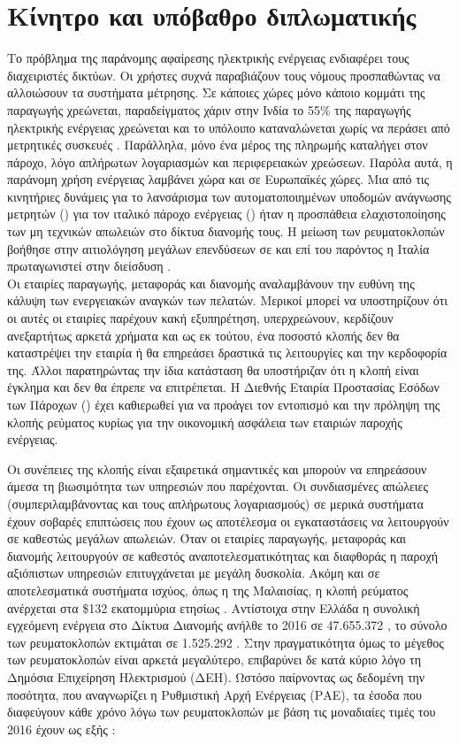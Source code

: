 \section{Κίνητρο και υπόβαθρο διπλωματικής}
Το πρόβλημα της παράνομης αφαίρεσης ηλεκτρικής ενέργειας ενδιαφέρει τους διαχειριστές δικτύων. Οι χρήστες συχνά παραβιάζουν τους νόμους προσπαθώντας να αλλοιώσουν τα συστήματα μέτρησης. Σε κάποιες χώρες μόνο κάποιο κομμάτι της παραγωγής χρεώνεται, παραδείγματος χάριν στην Ινδία το 55\% της παραγωγής ηλεκτρικής ενέργειας χρεώνεται και το υπόλοιπο καταναλώνεται χωρίς να περάσει από μετρητικές συσκευές \cite{india}. Παράλληλα, μόνο ένα μέρος της πληρωμής καταλήγει στον πάροχο, λόγο απλήρωτων λογαριασμών και περιφερειακών χρεώσεων. Παρόλα αυτά, η παράνομη χρήση ενέργειας λαμβάνει χώρα και σε Ευρωπαϊκές χώρες. Μια από τις κινητήριες δυνάμεις για το λανσάρισμα των αυτοματοποιημένων υποδομών ανάγνωσης μετρητών () για τον ιταλικό πάροχο ενέργειας () ήταν η προσπάθεια ελαχιστοποίησης των μη τεχνικών απωλειών στο δίκτυα διανομής τους. Η μείωση των ρευματοκλοπών βοήθησε στην αιτιολόγηση μεγάλων επενδύσεων σε  και επί του παρόντος η Ιταλία πρωταγωνιστεί στην διείσδυση  \cite{regulation}.\\ 
Οι εταιρίες παραγωγής, μεταφοράς και διανομής αναλαμβάνουν την ευθύνη της κάλυψη των ενεργειακών αναγκών των πελατών. Μερικοί μπορεί να υποστηρίζουν ότι οι αυτές οι εταιρίες παρέχουν κακή εξυπηρέτηση, υπερχρεώνουν, κερδίζουν ανεξαρτήτως αρκετά χρήματα και ως εκ τούτου, ένα ποσοστό κλοπής δεν θα καταστρέψει την εταιρία ή θα επηρεάσει δραστικά τις λειτουργίες και την κερδοφορία της. Άλλοι παρατηρώντας την ίδια κατάσταση θα υποστήριζαν ότι η κλοπή είναι έγκλημα και δεν θα έπρεπε να επιτρέπεται. Η Διεθνής Εταιρία Προστασίας Εσόδων των Πάροχων () έχει καθιερωθεί για να προάγει τον εντοπισμό και την πρόληψη της κλοπής ρεύματος κυρίως για την οικονομική ασφάλεια των εταιριών παροχής ενέργειας.\par
Οι συνέπειες της κλοπής είναι εξαιρετικά σημαντικές και μπορούν να επηρεάσουν άμεσα τη βιωσιμότητα των υπηρεσιών που παρέχονται. Οι συνδιασμένες απώλειες (συμπεριλαμβάνοντας και τους απλήρωτους λογαριασμούς) σε μερικά συστήματα έχουν σοβαρές επιπτώσεις που έχουν ως αποτέλεσμα οι εγκαταστάσεις να λειτουργούν σε καθεστώς μεγάλων απωλειών. Όταν οι εταιρίες παραγωγής, μεταφοράς και διανομής λειτουργούν σε καθεστός αναποτελεσματικότητας και διαφθοράς η παροχή αξιόπιστων υπηρεσιών επιτυγχάνεται με μεγάλη δυσκολία. Ακόμη και σε αποτελεσματικά συστήματα ισχύος, όπως η  της Μαλαισίας, η κλοπή ρεύματος ανέρχεται στα \$132 εκατομμύρια ετησίως \cite{malaysia}. Αντίστοιχα στην Ελλάδα η συνολική εγχεόμενη ενέργεια στο Δίκτυα Διανομής ανήλθε το 2016 σε 47.655.372 , το σύνολο των ρευματοκλοπών εκτιμάται σε 1.525.292 . Στην πραγματικότητα όμως το μέγεθος των ρευματοκλοπών είναι αρκετά μεγαλύτερο, επιβαρύνει δε κατά κύριο λόγο τη Δημόσια Επιχείρηση Ηλεκτρισμού (ΔΕΗ). Ωστόσο παίρνοντας ως δεδομένη την ποσότητα, που αναγνωρίζει η Ρυθμιστική Αρχή Ενέργειας (ΡΑΕ), τα έσοδα που διαφεύγουν κάθε χρόνο λόγω των ρευματοκλοπών με βάση τις μοναδιαίες τιμές του 2016 έχουν ως εξής \cite{dehfraud}:

